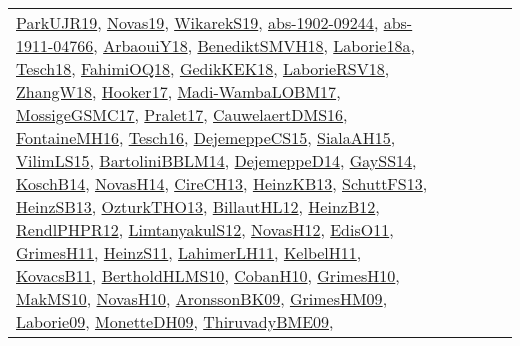{\begin{longtable}{lp{3cm}>{\raggedright}p{6cm}>{\raggedright}p{6cm}p{8cm}}
\href{papers/ParkUJR19.pdf}{ParkUJR19}\cite{ParkUJR19}, \href{articles/Novas19.pdf}{Novas19}\cite{Novas19}, \href{articles/WikarekS19.pdf}{WikarekS19}\cite{WikarekS19}, \href{articles/abs-1902-09244.pdf}{abs-1902-09244}\cite{abs-1902-09244}, \href{articles/abs-1911-04766.pdf}{abs-1911-04766}\cite{abs-1911-04766}, \href{papers/ArbaouiY18.pdf}{ArbaouiY18}\cite{ArbaouiY18}, \href{papers/BenediktSMVH18.pdf}{BenediktSMVH18}\cite{BenediktSMVH18}, \href{papers/Laborie18a.pdf}{Laborie18a}\cite{Laborie18a}, \href{papers/Tesch18.pdf}{Tesch18}\cite{Tesch18}, \href{articles/FahimiOQ18.pdf}{FahimiOQ18}\cite{FahimiOQ18}, \href{articles/GedikKEK18.pdf}{GedikKEK18}\cite{GedikKEK18}, \href{articles/LaborieRSV18.pdf}{LaborieRSV18}\cite{LaborieRSV18}, \href{articles/ZhangW18.pdf}{ZhangW18}\cite{ZhangW18}, \href{papers/Hooker17.pdf}{Hooker17}\cite{Hooker17}, \href{papers/Madi-WambaLOBM17.pdf}{Madi-WambaLOBM17}\cite{Madi-WambaLOBM17}, \href{papers/MossigeGSMC17.pdf}{MossigeGSMC17}\cite{MossigeGSMC17}, \href{papers/Pralet17.pdf}{Pralet17}\cite{Pralet17}, \href{papers/CauwelaertDMS16.pdf}{CauwelaertDMS16}\cite{CauwelaertDMS16}, \href{papers/FontaineMH16.pdf}{FontaineMH16}\cite{FontaineMH16}, \href{papers/Tesch16.pdf}{Tesch16}\cite{Tesch16}, \href{papers/DejemeppeCS15.pdf}{DejemeppeCS15}\cite{DejemeppeCS15}, \href{papers/SialaAH15.pdf}{SialaAH15}\cite{SialaAH15}, \href{papers/VilimLS15.pdf}{VilimLS15}\cite{VilimLS15}, \href{papers/BartoliniBBLM14.pdf}{BartoliniBBLM14}\cite{BartoliniBBLM14}, \href{papers/DejemeppeD14.pdf}{DejemeppeD14}\cite{DejemeppeD14}, \href{papers/GaySS14.pdf}{GaySS14}\cite{GaySS14}, \href{papers/KoschB14.pdf}{KoschB14}\cite{KoschB14}, \href{articles/NovasH14.pdf}{NovasH14}\cite{NovasH14}, \href{papers/CireCH13.pdf}{CireCH13}\cite{CireCH13}, \href{papers/HeinzKB13.pdf}{HeinzKB13}\cite{HeinzKB13}, \href{papers/SchuttFS13.pdf}{SchuttFS13}\cite{SchuttFS13}, \href{articles/HeinzSB13.pdf}{HeinzSB13}\cite{HeinzSB13}, \href{articles/OzturkTHO13.pdf}{OzturkTHO13}\cite{OzturkTHO13}, \href{papers/BillautHL12.pdf}{BillautHL12}\cite{BillautHL12}, \href{papers/HeinzB12.pdf}{HeinzB12}\cite{HeinzB12}, \href{papers/RendlPHPR12.pdf}{RendlPHPR12}\cite{RendlPHPR12}, \href{articles/LimtanyakulS12.pdf}{LimtanyakulS12}\cite{LimtanyakulS12}, \href{articles/NovasH12.pdf}{NovasH12}\cite{NovasH12}, \href{papers/EdisO11.pdf}{EdisO11}\cite{EdisO11}, \href{papers/GrimesH11.pdf}{GrimesH11}\cite{GrimesH11}, \href{papers/HeinzS11.pdf}{HeinzS11}\cite{HeinzS11}, \href{papers/LahimerLH11.pdf}{LahimerLH11}\cite{LahimerLH11}, \href{articles/KelbelH11.pdf}{KelbelH11}\cite{KelbelH11}, \href{articles/KovacsB11.pdf}{KovacsB11}\cite{KovacsB11}, \href{papers/BertholdHLMS10.pdf}{BertholdHLMS10}\cite{BertholdHLMS10}, \href{papers/CobanH10.pdf}{CobanH10}\cite{CobanH10}, \href{papers/GrimesH10.pdf}{GrimesH10}\cite{GrimesH10}, \href{papers/MakMS10.pdf}{MakMS10}\cite{MakMS10}, \href{articles/NovasH10.pdf}{NovasH10}\cite{NovasH10}, \href{papers/AronssonBK09.pdf}{AronssonBK09}\cite{AronssonBK09}, \href{papers/GrimesHM09.pdf}{GrimesHM09}\cite{GrimesHM09}, \href{papers/Laborie09.pdf}{Laborie09}\cite{Laborie09}, \href{papers/MonetteDH09.pdf}{MonetteDH09}\cite{MonetteDH09}, \href{papers/ThiruvadyBME09.pdf}{ThiruvadyBME09}\cite{ThiruvadyBME09}, 
\end{longtable}}

